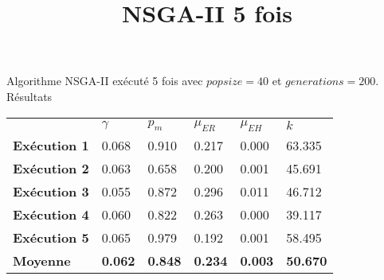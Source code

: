 \documentclass[a4paper, 11pt]{article}
\title{NSGA-II 5 fois}
\author{}
\date{}
\begin{document}
\maketitle

Algorithme NSGA-II exécuté 5 fois avec $popsize = 40$ et $generations = 200$. Résultats
\begin{center}
\begin{tabular}{llllll}
\textbf{} & $\gamma$ & $p_m$ & $\mu_{ER}$ & $\mu_{EH}$ & $k$\\
\textbf{Exécution 1} & 0.068 & 0.910 & 0.217 & 0.000 & 63.335\\
\textbf{Exécution 2} & 0.063 & 0.658 & 0.200 & 0.001 & 45.691\\
\textbf{Exécution 3} & 0.055 & 0.872 & 0.296 & 0.011 & 46.712\\
\textbf{Exécution 4} & 0.060 & 0.822 & 0.263 & 0.000 & 39.117\\
\textbf{Exécution 5} & 0.065 & 0.979 & 0.192 & 0.001 & 58.495\\
\textbf{Moyenne} & \textbf{0.062} & \textbf{0.848} & \textbf{0.234} & \textbf{0.003} & \textbf{50.670}
\end{tabular}
\end{center}
\end{document}
